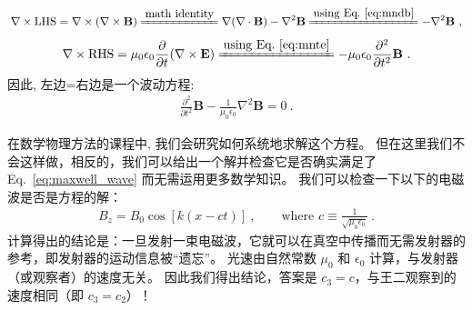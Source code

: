 {	\begin{align} \nonumber
		\nabla\times\mbox{LHS} = \nabla\times(\nabla\times \mathbf{B})
		\xlongequal{\mbox{math identity}} \nabla (\nabla\cdot \mathbf{B}) - \nabla^2 \mathbf{B} \xlongequal{\mbox{using Eq.~\eqref{eq:mndb}}}
		- \nabla^2 \mathbf{B} ~,
	\end{align} 
	\begin{align} \nonumber
		\nabla\times\mbox{RHS} =  \mu_0\epsilon_0 \frac{\partial}{\partial t} (\nabla \times \mathbf{E}) 
		\xlongequal{\mbox{using Eq.~\eqref{eq:mnte}}} -\mu_0\epsilon_0 \frac{\partial^2}{\partial t^2} \mathbf{B} ~.
	\end{align}
	因此, 左边=右边是一个波动方程:
	\begin{align}
		\label{eq:maxwell_wave}
		\frac{\partial^2}{\partial t^2} \mathbf{B} 
		- \frac{1}{\mu_0\epsilon_0} \nabla^2 \mathbf{B} = 0~. 
	\end{align}
	
	
	在数学物理方法的课程中, 我们会研究如何系统地求解这个方程。 但在这里我们不会这样做，相反的，我们可以给出一个解并检查它是否确实满足了 Eq.~\eqref{eq:maxwell_wave} 而无需运用更多数学知识。 我们可以检查一下以下的电磁 波是否是方程的解：
	\begin{align}
		\label{eq:sol_maxwell_wave}	B_z = B_0 \cos [k (x - ct) ]~,
		\qquad \mbox{where~} c \equiv \frac{1}{\sqrt{\mu_0\epsilon_0}} ~.
	\end{align}
计算得出的结论是：一旦发射一束电磁波，它就可以在真空中传播而无需发射器的参考，即发射器的运动信息被“遗忘”。 光速由自然常数 $\mu_0$ 和 $\epsilon_0$ 计算，与发射器（或观察者）的速度无关。 因此我们得出结论，答案是 $c_3=c$，与王二观察到的速度相同（即 $c_3=c_2$）！}

